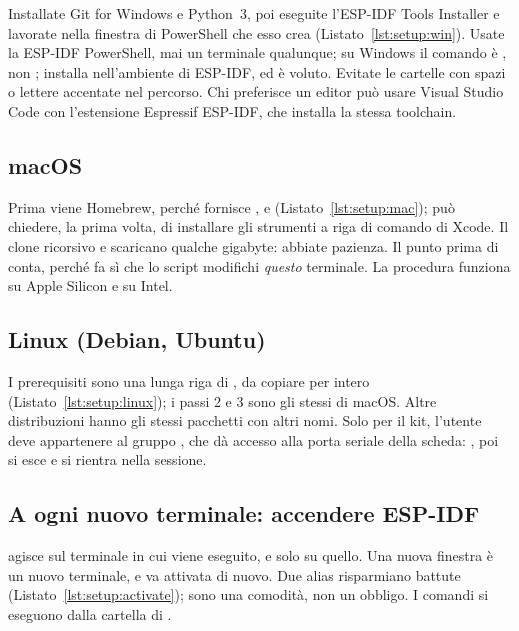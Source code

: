 Installate Git for Windows e Python~3, poi eseguite l'ESP-IDF Tools Installer e
lavorate nella finestra di PowerShell che esso crea
(Listato~\ref{lst:setup:win}). Usate la ESP-IDF PowerShell, mai un terminale
qualunque; su Windows il comando è , non ;
 installa nell'ambiente di ESP-IDF, ed è voluto. Evitate le cartelle
con spazi o lettere accentate nel percorso. Chi preferisce un editor può usare
Visual Studio Code con l'estensione Espressif ESP-IDF, che installa la stessa
toolchain.


\subsection{macOS}

Prima viene Homebrew, perché fornisce ,  e 
(Listato~\ref{lst:setup:mac});  può chiedere, la prima volta, di
installare gli strumenti a riga di comando di Xcode. Il clone ricorsivo e
 scaricano qualche gigabyte: abbiate pazienza. Il punto prima
di  conta, perché fa sì che lo script modifichi \emph{questo}
terminale. La procedura funziona su Apple Silicon e su Intel.


\subsection{Linux (Debian, Ubuntu)}

I prerequisiti sono una lunga riga di , da copiare per intero
(Listato~\ref{lst:setup:linux}); i passi 2 e 3 sono gli stessi di macOS. Altre
distribuzioni hanno gli stessi pacchetti con altri nomi. Solo per il kit,
l'utente deve appartenere al gruppo , che dà accesso alla porta
seriale della scheda: , poi si esce e si
rientra nella sessione.


\subsection{A ogni nuovo terminale: accendere ESP-IDF}

 agisce sul terminale in cui viene eseguito, e solo su quello.
Una nuova finestra è un nuovo terminale, e va attivata di nuovo. Due alias
risparmiano battute (Listato~\ref{lst:setup:activate}); sono una comodità, non
un obbligo. I comandi  si eseguono dalla cartella di \prg.

